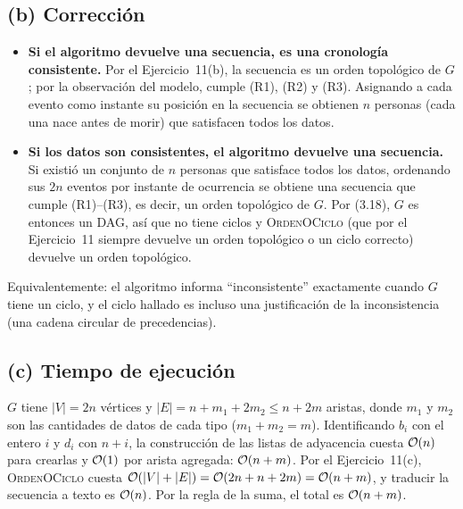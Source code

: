 \subsection*{(b) Corrección}
\begin{itemize}
\item \textbf{Si el algoritmo devuelve una secuencia, es una cronología consistente.} Por el
Ejercicio~11(b), la secuencia es un orden topológico de $G$; por la observación del modelo, cumple (R1),
(R2) y (R3). Asignando a cada evento como instante su posición en la secuencia se obtienen $n$ personas
(cada una nace antes de morir) que satisfacen todos los datos.
\item \textbf{Si los datos son consistentes, el algoritmo devuelve una secuencia.} Si existió un conjunto
de $n$ personas que satisface todos los datos, ordenando sus $2n$ eventos por instante de ocurrencia se
obtiene una secuencia que cumple (R1)--(R3), es decir, un orden topológico de $G$. Por (3.18), $G$ es
entonces un DAG, así que no tiene ciclos y \textsc{OrdenOCiclo} (que por el Ejercicio~11 siempre
devuelve un orden topológico o un ciclo correcto) devuelve un orden topológico.
\end{itemize}
Equivalentemente: el algoritmo informa ``inconsistente'' exactamente cuando $G$ tiene un ciclo, y el ciclo
hallado es incluso una justificación de la inconsistencia (una cadena circular de precedencias).

\subsection*{(c) Tiempo de ejecución}
$G$ tiene $|V|=2n$ vértices y $|E|=n+m_1+2m_2\le n+2m$ aristas, donde $m_1$ y $m_2$ son las
cantidades de datos de cada tipo ($m_1+m_2=m$). Identificando $b_i$ con el entero $i$ y $d_i$ con $n+i$,
la construcción de las listas de adyacencia cuesta $\mathcal{O}(n)$ para crearlas y $\mathcal{O}(1)$ por arista
agregada: $\mathcal{O}(n+m)$. Por el Ejercicio~11(c), \textsc{OrdenOCiclo} cuesta $\mathcal{O}(|V|+|E|)=\mathcal{O}(2n+n+2m)=
\mathcal{O}(n+m)$, y traducir la secuencia a texto es $\mathcal{O}(n)$. Por la regla de la suma, el total es $\mathcal{O}(n+m)$.


